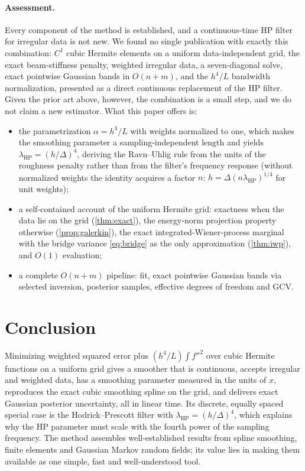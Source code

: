 \documentclass[11pt,a4paper]{article}
\theoremstyle{definition}
\theoremstyle{remark}
\begin{document}
\paragraph{Assessment.} Every component of the method is established, and a continuous-time HP filter for irregular data is not new. We found no single publication with exactly this combination: $C^1$ cubic Hermite elements on a uniform data-independent grid, the exact beam-stiffness penalty, weighted irregular data, a seven-diagonal solve, exact pointwise Gaussian bands in $O(n+m)$, and the $h^4/L$ bandwidth normalization, presented as a direct continuous replacement of the HP filter. Given the prior art above, however, the combination is a small step, and we do not claim a new estimator. What this paper offers is:
\begin{itemize}[itemsep=2pt]
\item the parametrization $\alpha=h^4/L$ with weights normalized to one, which makes the smoothing parameter a sampling-independent length and yields $\lambda_{\mathrm{HP}}=(h/\Delta)^4$, deriving the Ravn--Uhlig rule from the units of the roughness penalty rather than from the filter's frequency response (without normalized weights the identity acquires a factor $n$: $h=\Delta(n\lambda_{\mathrm{HP}})^{1/4}$ for unit weights);
\item a self-contained account of the uniform Hermite grid: exactness when the data lie on the grid (\cref{thm:exact}), the energy-norm projection property otherwise (\cref{prop:galerkin}), the exact integrated-Wiener-process marginal with the bridge variance \eqref{eq:bridge} as the only approximation (\cref{thm:iwp}), and $O(1)$ evaluation;
\item a complete $O(n+m)$ pipeline: fit, exact pointwise Gaussian bands via selected inversion, posterior samples, effective degrees of freedom and GCV.
\end{itemize}

\section{Conclusion}
\label{sec:conclusion}

Minimizing weighted squared error plus $(h^4/L)\int f''^2$ over cubic Hermite functions on a uniform grid gives a smoother that is continuous, accepts irregular and weighted data, has a smoothing parameter measured in the units of $x$, reproduces the exact cubic smoothing spline on the grid, and delivers exact Gaussian posterior uncertainty, all in linear time. Its discrete, equally spaced special case is the Hodrick--Prescott filter with $\lambda_{\mathrm{HP}}=(h/\Delta)^4$, which explains why the HP parameter must scale with the fourth power of the sampling frequency. The method assembles well-established results from spline smoothing, finite elements and Gaussian Markov random fields; its value lies in making them available as one simple, fast and well-understood tool.




\end{document}
